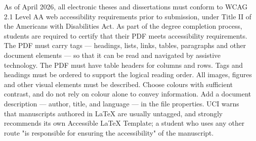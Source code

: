 

%
%
\thesisrequiretagging
\thesisrequiredocumentlanguage
{}
	{As of April 2026, all electronic theses and dissertations must conform to
	 WCAG 2.1 Level AA web accessibility requirements prior to submission, under
	 Title II of the Americans with Disabilities Act.}
	{As part of the degree completion process, students are required to certify
	 that their PDF meets accessibility requirements.}
	{The PDF must carry tags — headings, lists, links, tables, paragraphs and
	 other document elements — so that it can be read and navigated by
	 assistive technology.}
	{The PDF must have table headers for columns and rows.}
	{Tags and headings must be ordered to support the logical reading order.}
	{All images, figures and other visual elements must be described.}
	{Choose colours with sufficient contrast, and do not rely on colour alone to
	 convey information.}
	{Add a document description — author, title, and language — in the file
	 properties.}
	{UCI warns that manuscripts authored in LaTeX are usually untagged, and
	 strongly recommends its own Accessible LaTeX Template; a student who uses
	 any other route "is responsible for ensuring the accessibility" of the
	 manuscript.}

